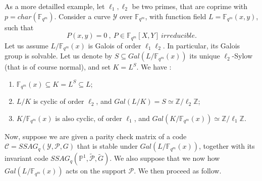 \documentclass[10pt]{article}
\newcommand{\Z}{\mathbb{Z}}
\newcommand{\fqm}{\mathbb{F}_{q^m}}
\newcommand{\su}{\subseteq}
\newcommand{\Y}{\mathcal{Y}}
\newcommand{\PR}{\mathcal{P}}
\begin{document}
As a more detailled example, let $\ell_1,\ell_2$ be two primes, that are coprime with $p=char(\fqm)$. Consider a curve $\Y$ over $\fqm$, with function field $L = \fqm(x,y)$, such that
\[P(x,y) = 0 \ , \ P \in \fqm[X,Y] \ irreducible .\]
Let us assume $L/\fqm(x)$ is Galois of order $\ell_1\ell_2$. In particular, its Galois group is solvable. Let us denote by $S \su Gal(L/\fqm(x))$ its unique $\ell_2$-Sylow (that is of course normal), and set $K = L^S$. We have :
\begin{enumerate}
\item  $\fqm(x) \su K=L^S \su L$;
\item $L/K$ is cyclic of order $\ell_2$, and $Gal(L/K) = S \simeq \Z/\ell_2\Z$;
\item $K/\fqm(x)$ is also cyclic, of order $\ell_1$, and $Gal(K/\fqm(x)) \simeq \Z/\ell_1\Z$.
\end{enumerate}

Now, suppose we are given a parity check matrix of a code $\mathcal{C} = SSAG_q(\Y,\PR,G)$ that is stable under $Gal(L/\fqm(x))$, together with its invariant code $SSAG_q(\mathbb{P}^1,\tilde{\PR},\tilde{G})$. We also suppose that we now how $Gal(L/\fqm(x))$ acts on the support $\PR$. We then proceed as follow.
\end{document}
